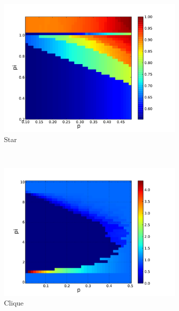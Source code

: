 \documentclass{article}
\begin{document}
\begin{figure}
        \centering
        \begin{subfigure}[b]{0.3\textwidth}
                \centering
                \includegraphics[width=\textwidth]{star_n10.pdf}
                \caption{Star}
        \end{subfigure}
        ~ 
        \begin{subfigure}[b]{0.3\textwidth}
                \centering
                \includegraphics[width=\textwidth]{clique_n10.pdf}
                \caption{Clique}
        \end{subfigure}
        ~ 
        \begin{subfigure}[b]{0.3\textwidth}
                \centering

\end{subfigure}
\end{figure}
\end{document}
